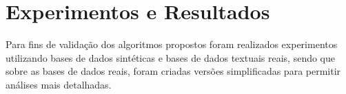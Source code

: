 \documentclass[
    12pt,                %
    oneside,            %
    a4paper,            %
    english,            %
    brazil                %
    ]{abntex2ppgsi}
\begin{document}







\chapter{Experimentos e Resultados}
\label{ch:experiments}


Para fins de validação dos algoritmos propostos foram realizados experimentos utilizando bases de dados sintéticas e bases de dados textuais reais, sendo que sobre as bases de dados reais, foram criadas versões simplificadas para permitir análises mais detalhadas.
\end{document}
